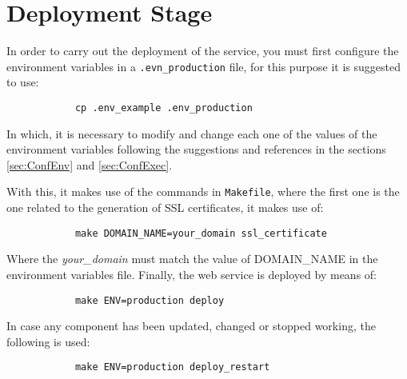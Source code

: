 \documentclass[12pt,a4paper]{article}
\begin{document}
    \newpage

    \section{Deployment Stage}
    {
        In order to carry out the deployment of the service, you must first configure the 
        environment variables in a \verb*|.evn_production| file, for this purpose it 
        is suggested to use:

        \begin{verbatim}
            cp .env_example .env_production
        \end{verbatim}

        In which, it is necessary to modify and change each one of the values of the 
        environment variables following the suggestions and references in the sections 
        \ref{sec:ConfEnv} and \ref{sec:ConfExec}.

        With this, it makes use of the commands in \verb*|Makefile|, where the first 
        one is the one related to the generation of SSL certificates, it makes use of:

        \begin{verbatim}
            make DOMAIN_NAME=your_domain ssl_certificate
        \end{verbatim}

        Where the \emph{your\_domain} must match the value of DOMAIN\_NAME in the environment 
        variables file. Finally, the web service is deployed by means of:

        \begin{verbatim}
            make ENV=production deploy
        \end{verbatim}

        In case any component has been updated, changed or stopped working, the following 
        is used:

        \begin{verbatim}
            make ENV=production deploy_restart
        \end{verbatim}
    }
\end{document}
